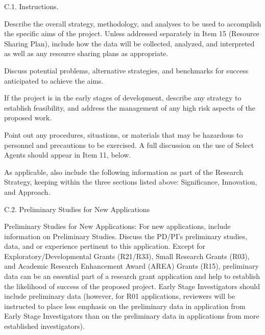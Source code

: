\documentclass[11pt,notitlepage]{article}
\begin{document}
\begin{description}
\item[C.1. Instructions.]{}
\end{description}

Describe the overall strategy, methodology, and analyses to be used to accomplish the specific aims of the project. Unless addressed separately in Item 15 (Resource Sharing Plan), include how the data will be collected, analyzed, and interpreted as well as any resource sharing plans as appropriate.

Discuss potential problems, alternative strategies, and benchmarks for success anticipated to achieve the aims.

If the project is in the early stages of development, describe any strategy to establish feasibility, and address the management of any high risk aspects of the proposed work.

Point out any procedures, situations, or materials that may be hazardous to personnel and precautions to be exercised. A full discussion on the use of Select Agents should appear in Item 11, below.

As applicable, also include the following information as part of the Research Strategy, keeping within the three sections listed above: Significance, Innovation, and Approach.

\begin{description}
\item[C.2. Preliminary Studies for New Applications]{}
\end{description}

Preliminary Studies for New Applications: For new applications, include information on Preliminary Studies. Discuss the PD/PI's preliminary studies, data, and or experience pertinent to this application. Except for Exploratory/Developmental Grants (R21/R33), Small Research Grants (R03), and Academic Research Enhancement Award (AREA) Grants (R15), preliminary data can be an essential part of a research grant application and help to establish the likelihood of success of the proposed project. Early Stage Investigators should include preliminary data (however, for R01 applications, reviewers will be instructed to place less emphasis on the preliminary data in application from Early Stage Investigators than on the preliminary data in applications from more established investigators).


\newpage
\end{document}
